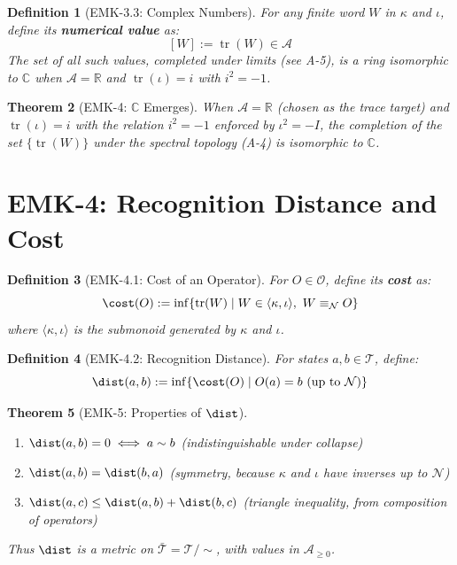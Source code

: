 \documentclass[12pt, oneside]{article}
\newtheorem{theorem}{Theorem}[section]
\newtheorem{definition}[theorem]{Definition}
\DeclareMathOperator{\tr}{tr}
\newcommand{\N}{\mathcal{N}}
\newcommand{\A}{\mathcal{A}}
\newcommand{\T}{\mathcal{T}}
\newcommand{\Opr}{\mathcal{O}}
\begin{document}
\begin{definition}[EMK-3.3: Complex Numbers]
For any finite word $W$ in $\kappa$ and $\iota$, define its \textbf{numerical value} as:
\[
[W] := \tr(W) \in \A
\]
The set of all such values, completed under limits (see A-5), is a ring isomorphic to $\mathbb{C}$ when $\A = \mathbb{R}$ and $\tr(\iota) = i$ with $i^2 = -1$.
\end{definition}

\begin{theorem}[EMK-4: $\mathbb{C}$ Emerges]
When $\A = \mathbb{R}$ (chosen as the trace target) and $\tr(\iota) = i$ with the relation $i^2 = -1$ enforced by $\iota^2 = -I$, the completion of the set $\{\tr(W)\}$ under the spectral topology (A-4) is isomorphic to $\mathbb{C}$.
\end{theorem}

\section{EMK-4: Recognition Distance and Cost}

\begin{definition}[EMK-4.1: Cost of an Operator]
For $O \in \Opr$, define its \textbf{cost} as:
\[
\cost(O) := \inf \{ \tr(W) \mid W \in \langle \kappa, \iota \rangle,\ W \equiv_\N O \}
\]
where $\langle \kappa, \iota \rangle$ is the submonoid generated by $\kappa$ and $\iota$.
\end{definition}

\begin{definition}[EMK-4.2: Recognition Distance]
For states $a, b \in \T$, define:
\[
\dist(a,b) := \inf \{ \cost(O) \mid O(a) = b \text{ (up to } \N\text{)} \}
\]
\end{definition}

\begin{theorem}[EMK-5: Properties of $\dist$]
\begin{enumerate}
    \item $\dist(a,b) = 0 \iff a \sim b$ (indistinguishable under collapse)
    \item $\dist(a,b) = \dist(b,a)$ (symmetry, because $\kappa$ and $\iota$ have inverses up to $\N$)
    \item $\dist(a,c) \le \dist(a,b) + \dist(b,c)$ (triangle inequality, from composition of operators)
\end{enumerate}
Thus $\dist$ is a metric on $\bar{\T} = \T/\!\sim$, with values in $\A_{\ge 0}$.
\end{theorem}
\end{document}
